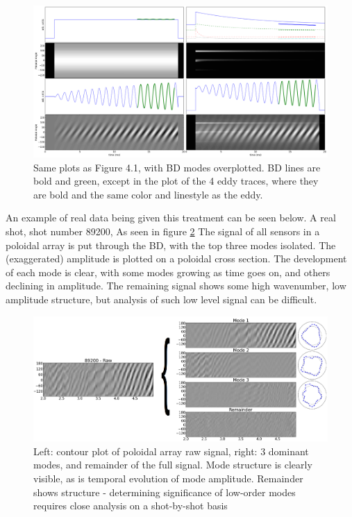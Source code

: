 \begin{figure}
\includegraphics[width = \textwidth]{./figures/Artificial_Signal_and_BD.png}\begin{flushleft}
\caption{Same plots as Figure 4.1, with BD modes overplotted.  BD lines are bold and green, except in the plot of the 4 eddy traces, where they are bold and the same color and linestyle as the eddy.}\label{fig:Synthetic_plus_BD}
\end{flushleft}
\end{figure}
An example of real data being given this treatment can be seen below.  A real shot, shot number 89200, 
As seen in figure \ref{fig:PA_sensors_top_3_modes} The signal of all sensors in a poloidal array is put through the BD, with the top three modes isolated.  The (exaggerated) amplitude is plotted on a poloidal cross section.  The development of each mode is clear, with some modes growing as time goes on, and others declining in amplitude.  The remaining signal shows some high wavenumber, low amplitude structure, but analysis of such low level signal can be difficult.

\begin{figure}
\includegraphics[width = \textwidth]{./figures/stripey_flucts_joined_grey_89200_mod.png}\begin{flushleft}
\caption{Left: contour plot of poloidal array raw signal, right: 3 dominant modes, and remainder of the full signal.  Mode structure is clearly visible, as is temporal evolution of mode amplitude.  Remainder shows structure - determining significance of low-order modes requires close analysis on a shot-by-shot basis}\label{fig:PA_sensors_top_3_modes}
\end{flushleft}
\end{figure}

